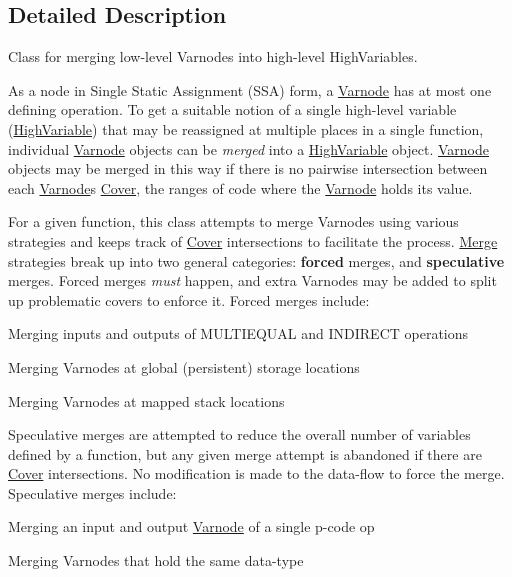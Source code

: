 \subsection{Detailed Description}
Class for merging low-\/level Varnodes into high-\/level High\+Variables. 

As a node in Single Static Assignment (S\+SA) form, a \mbox{\hyperlink{class_varnode}{Varnode}} has at most one defining operation. To get a suitable notion of a single high-\/level variable (\mbox{\hyperlink{class_high_variable}{High\+Variable}}) that may be reassigned at multiple places in a single function, individual \mbox{\hyperlink{class_varnode}{Varnode}} objects can be {\itshape merged} into a \mbox{\hyperlink{class_high_variable}{High\+Variable}} object. \mbox{\hyperlink{class_varnode}{Varnode}} objects may be merged in this way if there is no pairwise intersection between each \mbox{\hyperlink{class_varnode}{Varnode}}\textquotesingle{}s \mbox{\hyperlink{class_cover}{Cover}}, the ranges of code where the \mbox{\hyperlink{class_varnode}{Varnode}} holds its value.

For a given function, this class attempts to merge Varnodes using various strategies and keeps track of \mbox{\hyperlink{class_cover}{Cover}} intersections to facilitate the process. \mbox{\hyperlink{class_merge}{Merge}} strategies break up into two general categories\+: {\bfseries{forced}} merges, and {\bfseries{speculative}} merges. Forced merges {\itshape must} happen, and extra Varnodes may be added to split up problematic covers to enforce it. Forced merges include\+:
\begin{DoxyItemize}
\item Merging inputs and outputs of M\+U\+L\+T\+I\+E\+Q\+U\+AL and I\+N\+D\+I\+R\+E\+CT operations
\item Merging Varnodes at global (persistent) storage locations
\item Merging Varnodes at mapped stack locations
\end{DoxyItemize}

Speculative merges are attempted to reduce the overall number of variables defined by a function, but any given merge attempt is abandoned if there are \mbox{\hyperlink{class_cover}{Cover}} intersections. No modification is made to the data-\/flow to force the merge. Speculative merges include\+:
\begin{DoxyItemize}
\item Merging an input and output \mbox{\hyperlink{class_varnode}{Varnode}} of a single p-\/code op
\item Merging Varnodes that hold the same data-\/type 
\end{DoxyItemize}

